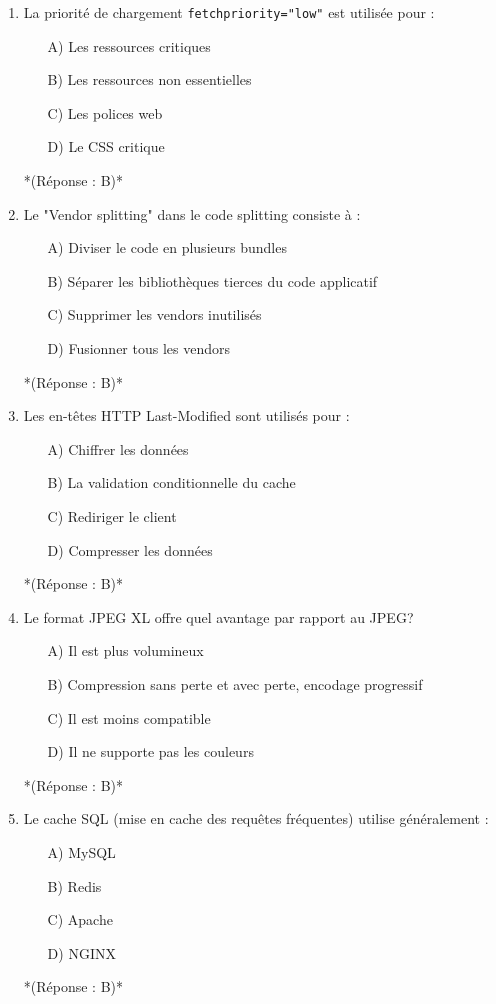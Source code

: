 \documentclass[12pt,a4paper,twoside]{report}
\begin{document}
\begin{enumerate}
\item La priorité de chargement \texttt{fetchpriority="low"} est utilisée pour :
\begin{itemize}
\item[A)] Les ressources critiques
\item[B)] Les ressources non essentielles
\item[C)] Les polices web
\item[D)] Le CSS critique
\end{itemize}
*(Réponse : B)*

\item Le "Vendor splitting" dans le code splitting consiste à :
\begin{itemize}
\item[A)] Diviser le code en plusieurs bundles
\item[B)] Séparer les bibliothèques tierces du code applicatif
\item[C)] Supprimer les vendors inutilisés
\item[D)] Fusionner tous les vendors
\end{itemize}
*(Réponse : B)*

\item Les en-têtes HTTP Last-Modified sont utilisés pour :
\begin{itemize}
\item[A)] Chiffrer les données
\item[B)] La validation conditionnelle du cache
\item[C)] Rediriger le client
\item[D)] Compresser les données
\end{itemize}
*(Réponse : B)*

\item Le format JPEG XL offre quel avantage par rapport au JPEG?
\begin{itemize}
\item[A)] Il est plus volumineux
\item[B)] Compression sans perte et avec perte, encodage progressif
\item[C)] Il est moins compatible
\item[D)] Il ne supporte pas les couleurs
\end{itemize}
*(Réponse : B)*

\item Le cache SQL (mise en cache des requêtes fréquentes) utilise généralement :
\begin{itemize}
\item[A)] MySQL
\item[B)] Redis
\item[C)] Apache
\item[D)] NGINX
\end{itemize}
*(Réponse : B)*


\end{enumerate}
\end{document}
